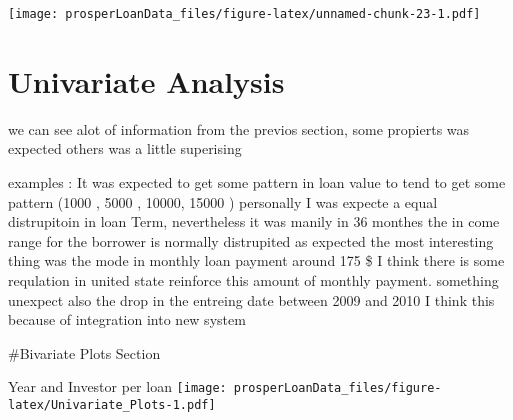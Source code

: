 \documentclass[]{article}
\newenvironment{Shaded}{\begin{snugshade}}{\end{snugshade}}
\newcommand{\DataTypeTok}[1]{\textcolor[rgb]{0.13,0.29,0.53}{#1}}
\newcommand{\DecValTok}[1]{\textcolor[rgb]{0.00,0.00,0.81}{#1}}
\newcommand{\KeywordTok}[1]{\textcolor[rgb]{0.13,0.29,0.53}{\textbf{#1}}}
\newcommand{\NormalTok}[1]{#1}
\newcommand{\OperatorTok}[1]{\textcolor[rgb]{0.81,0.36,0.00}{\textbf{#1}}}
\newcommand{\StringTok}[1]{\textcolor[rgb]{0.31,0.60,0.02}{#1}}
\begin{document}
\texttt{[image: prosperLoanData\_files/figure-latex/unnamed-chunk-23-1.pdf]}

\hypertarget{univariate-analysis}{%
\section{Univariate Analysis}\label{univariate-analysis}}

we can see alot of information from the previos section, some propierts
was expected others was a little superising

examples : It was expected to get some pattern in loan value to tend to
get some pattern (1000 , 5000 , 10000, 15000 ) personally I was expecte
a equal distrupitoin in loan Term, nevertheless it was manily in 36
monthes the in come range for the borrower is normally distrupited as
expected the most interesting thing was the mode in monthly loan payment
around 175 \$ I think there is some requlation in united state reinforce
this amount of monthly payment. something unexpect also the drop in the
entreing date between 2009 and 2010 I think this because of integration
into new system

\#Bivariate Plots Section

Year and Investor per loan
\texttt{[image: prosperLoanData\_files/figure-latex/Univariate\_Plots-1.pdf]}

\begin{Shaded}
\end{Shaded}
\end{document}
